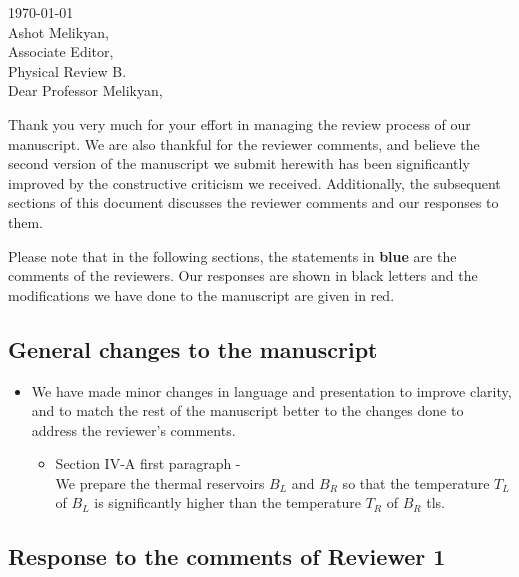 \documentclass{article}
\begin{document}

\today\\

Ashot Melikyan,\\
Associate Editor,\\
Physical Review B.\\

Dear Professor Melikyan,

Thank you very much for your effort in managing the review process of our manuscript. We are also thankful for the reviewer comments, and believe the second version of the manuscript we submit herewith has been significantly improved by the constructive criticism we received. Additionally, the subsequent sections of this document discusses the reviewer comments and our responses to them.

Please note that in the following sections, the statements in {\color{RoyalBlue} \textbf{blue}} are the comments of the reviewers. Our responses are shown in black letters and the modifications we have done to the manuscript are given in {\color{Maroon} red}.

\subsection*{General changes to the manuscript}

\begin{itemize}
    \item We have made minor changes in language and presentation to improve clarity, and to match the rest of the manuscript better to the changes done to address the reviewer's comments.
    \begin{itemize}
        \item Section IV-A first paragraph - \\
            {\color{Maroon} We prepare the thermal reservoirs $B_L$ and $B_R$ so that the temperature $T_L$ of $B_L$ is significantly higher than the temperature $T_R$ of $B_R$ \acrshort{tls}.}
    \end{itemize}
\end{itemize}

\subsection*{Response to the comments of Reviewer 1}
\end{document}
